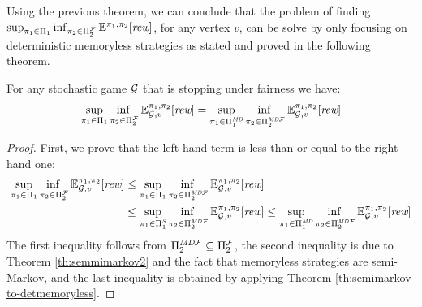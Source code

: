 Using the previous theorem, we can conclude that the problem of finding  $\sup_{\pi_{1} \in \Pi_{1}} \inf_{\pi_{2} \in \Pi^{\mathcal{F}}_{2}} \mathbb{E}^{\pi_{1}, \pi_{2}}[\textit{rew}]$, for any vertex $v$, can be solve by only focusing on deterministic memoryless strategies as stated and proved in the following theorem.
%
\begin{theorem}\label{th:reduce-to-memoryless}
  For any stochastic game $\mathcal{G}$  that is stopping under fairness we have:
  \[
  \adjustlimits \sup_{\strat{1} \in \Strategies{1}} \inf_{\strat{2} \in \FairStrats{2}} \Expect{\strat{1}}{\strat{2}}_{\StochG,v}[\Rewards]
  =
  \adjustlimits \sup_{\strat{1} \in \DetMemorylessStrats{1}} \inf_{\strat{2} \in \DetMemorylessFairStrats{2}} \Expect{\strat{1}}{\strat{2}}_{\StochG,v}[\Rewards]
 \]
\end{theorem}
%
\begin{proof}
	First, we prove that the left-hand term is less than or equal to the right-hand one:
\begin{align*}
  \adjustlimits \sup_{\strat{1} \in \Strategies{1}} \inf_{\strat{2} \in \FairStrats{2}} \Expect{\strat{1}}{\strat{2}}_{\StochG,v}[\Rewards]
  &{} \leq  \adjustlimits \sup_{\strat{1} \in \Strategies{1}} \inf_{\strat{2} \in \DetMemorylessFairStrats{2}} \Expect{\strat{1}}{\strat{2}}_{\StochG,v}[\Rewards]\\
  &{} \leq \adjustlimits  \sup_{\strat{1} \in \SemiMarkovStrats{1}} \inf_{\strat{2} \in \DetMemorylessFairStrats{2}} \Expect{\strat{1}}{\strat{2}}_{\StochG,v}[\Rewards]
  \leq \adjustlimits \sup_{\strat{1} \in \DetMemorylessStrats{1}} \inf_{\strat{2} \in \DetMemorylessFairStrats{2}} \Expect{\strat{1}}{\strat{2}}_{\StochG,v}[\Rewards]
\end{align*}
	The first inequality follows from $\Pi^{\textit{MD}\mathcal{F}}_{2} \subseteq \Pi^{\mathcal{F}}_{2}$, the second inequality is due to Theorem \ref{th:semmimarkov2} and the fact that memoryless strategies are semi-Markov, and the last inequality is obtained by applying Theorem \ref{th:semimarkov-to-detmemoryless}.
	

\end{proof}

